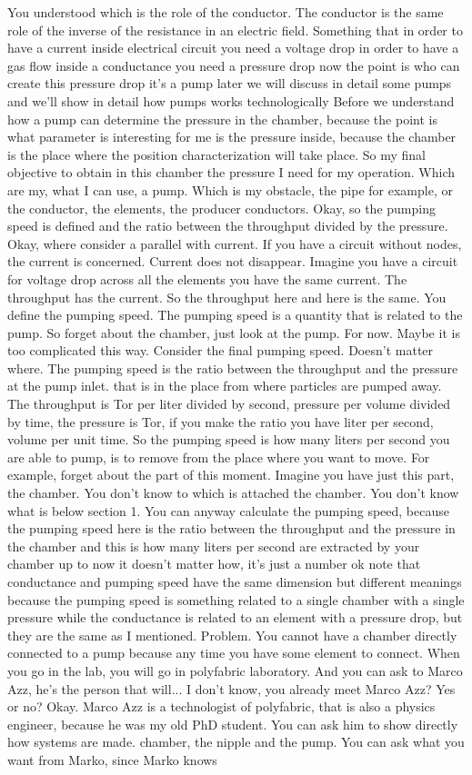 You understood which is the role of the conductor. The conductor is the same role of the inverse of the resistance in an electric field. Something that in order to have a current inside electrical circuit you need a voltage drop in order to have a gas flow inside a conductance you need a pressure drop now the point is who can create this pressure drop it's a pump later we will discuss in detail some pumps and we'll show in detail how pumps works technologically Before we understand how a pump can determine the pressure in the chamber, because the point is what parameter is interesting for me is the pressure inside, because the chamber is the place where the position characterization will take place. So my final objective to obtain in this chamber the pressure I need for my operation. Which are my, what I can use, a pump. Which is my obstacle, the pipe for example, or the conductor, the elements, the producer conductors. Okay, so the pumping speed is defined and the ratio between the throughput divided by the pressure. Okay, where consider a parallel with current. If you have a circuit without nodes, the current is concerned. Current does not disappear. Imagine you have a circuit for voltage drop across all the elements you have the same current. The throughput has the current. So the throughput here and here is the same. You define the pumping speed. The pumping speed is a quantity that is related to the pump. So forget about the chamber, just look at the pump. For now. Maybe it is too complicated this way. Consider the final pumping speed. Doesn't matter where. The pumping speed is the ratio between the throughput and the pressure at the pump inlet. that is in the place from where particles are pumped away. The throughput is Tor per liter divided by second, pressure per volume divided by time, the pressure is Tor, if you make the ratio you have liter per second, volume per unit time. So the pumping speed is how many liters per second you are able to pump, is to remove from the place where you want to move. For example, forget about the part of this moment. Imagine you have just this part, the chamber. You don't know to which is attached the chamber. You don't know what is below section 1. You can anyway calculate the pumping speed, because the pumping speed here is the ratio between the throughput and the pressure in the chamber and this is how many liters per second are extracted by your chamber up to now it doesn't matter how, it's just a number ok note that conductance and pumping speed have the same dimension but different meanings because the pumping speed is something related to a single chamber with a single pressure while the conductance is related to an element with a pressure drop, but they are the same as I mentioned. Problem. You cannot have a chamber directly connected to a pump because any time you have some element to connect. When you go in the lab, you will go in polyfabric laboratory. And you can ask to Marco Azz, he's the person that will... I don't know, you already meet Marco Azz? Yes or no? Okay. Marco Azz is a technologist of polyfabric, that is also a physics engineer, because he was my old PhD student. You can ask him to show directly how systems are made. chamber, the nipple and the pump. You can ask what you want from Marko, since Marko knows 